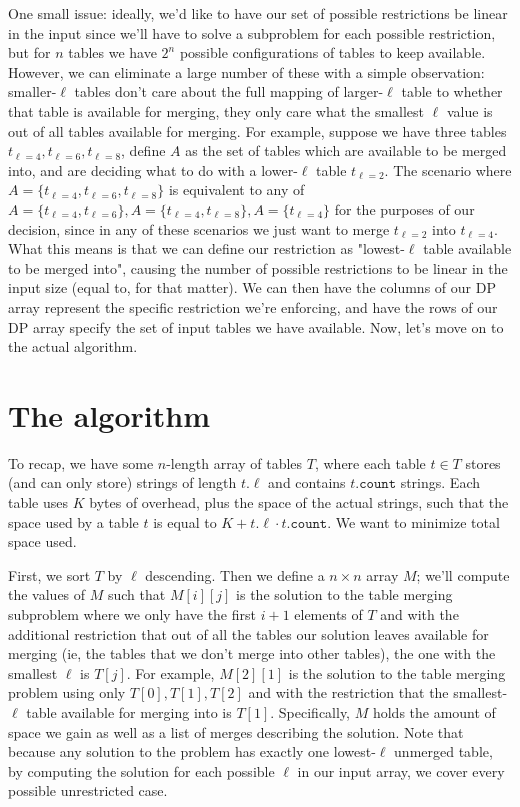 \documentclass{article}[12]
\begin{document}
One small issue: ideally, we'd like to have our set of possible restrictions be linear in the input since we'll have to solve a subproblem for each possible restriction, but for $n$ tables we have $2^n$ possible configurations of tables to keep available. However, we can eliminate a large number of these with a simple observation: smaller-$\ell$ tables don't care about the full mapping of larger-$\ell$ table to whether that table is available for merging, they only care what the smallest $\ell$ value is out of all tables available for merging. For example, suppose we have three tables $t_{\ell = 4}, t_{\ell = 6}, t_{\ell = 8}$, define $A$ as the set of tables which are available to be merged into, and are deciding what to do with a lower-$\ell$ table $t_{\ell = 2}$. The scenario where $A = \{ t_{\ell = 4}, t_{\ell = 6}, t_{\ell = 8} \}$ is equivalent to any of $A = \{ t_{\ell = 4}, t_{\ell = 6} \}, A = \{ t_{\ell = 4}, t_{\ell = 8} \}, A = \{ t_{\ell = 4} \}$ for the purposes of our decision, since in any of these scenarios we just want to merge $t_{\ell = 2}$ into $t_{\ell = 4}$.\\

What this means is that we can define our restriction as "lowest-$\ell$ table available to be merged into", causing the number of possible restrictions to be linear in the input size (equal to, for that matter). We can then have the columns of our DP array represent the specific restriction we're enforcing, and have the rows of our DP array specify the set of input tables we have available. Now, let's move on to the actual algorithm.\\

\section{The algorithm}
To recap, we have some $n$-length array of tables $T$, where each table $t \in T$ stores (and can only store) strings of length $t.\ell$ and contains $t.\texttt{count}$ strings. Each table uses $K$ bytes of overhead, plus the space of the actual strings, such that the space used by a table $t$ is equal to $K + t.\ell \cdot t.\texttt{count}$. We want to minimize total space used.

First, we sort $T$ by $\ell$ descending. Then we define a $n \times n$ array $M$; we'll compute the values of $M$ such that $M[i][j]$ is the solution to the table merging subproblem where we only have the first $i+1$ elements of $T$ and with the additional restriction that out of all the tables our solution leaves available for merging (ie, the tables that we don't merge into other tables), the one with the smallest $\ell$ is $T[j]$. For example, $M[2][1]$ is the solution to the table merging problem using only $T[0], T[1], T[2]$ and with the restriction that the smallest-$\ell$ table available for merging into is $T[1]$. Specifically, $M$ holds the amount of space we gain as well as a list of merges describing the solution.  Note that because any solution to the problem has exactly one lowest-$\ell$ unmerged table, by computing the solution for each possible $\ell$ in our input array, we cover every possible unrestricted case.\\
\end{document}
